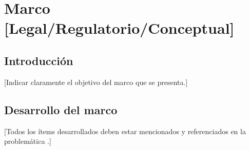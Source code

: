 
\chapter{Marco [Legal/Regulatorio/Conceptual]}
\label{ch:framework}

\section{Introducción}
[Indicar claramente el objetivo del marco que se presenta.]

\section{Desarrollo del marco}
[Todos los ítems desarrollados deben estar mencionados
y referenciados en la problemática \citex.]
